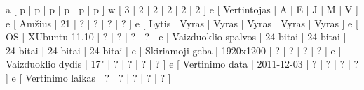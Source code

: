 \xtableu
{
  a [ p | p | p | p | p | p ]
  w [ 3 | 2 | 2 | 2 | 2 | 2 ]
  e [ Vertintojas         | A | E | J | M | V ]
  e [ Amžius              | 21 | ? | ? | ? | ? ]
  e [ Lytis               | Vyras | Vyras | Vyras | Vyras | Vyras ]
  e [ OS                  | XUbuntu 11.10 | ? | ? | ? | ? ]
  e [ Vaizduoklio spalvos | 24 bitai | 24 bitai | 24 bitai | 24 bitai | 24 bitai ]
  e [ Skiriamoji geba     | 1920x1200 | ? | ? | ? | ? ]
  e [ Vaizduoklio dydis   | 17" | ? | ? | ? | ? ]
  e [ Vertinimo data      | 2011-12-03 | ? | ? | ? | ? ]
  e [ Vertinimo laikas    | ? | ? | ? | ? | ? ]
}